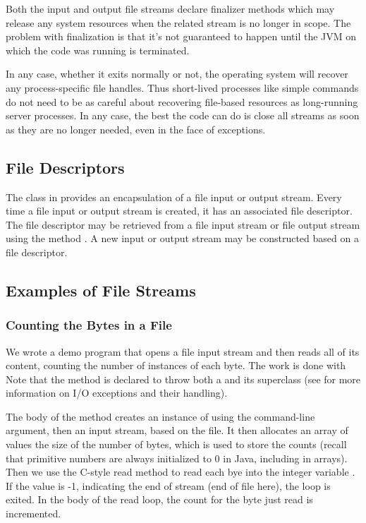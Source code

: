 Both the input and output file streams declare finalizer methods which
may release any system resources when the related stream is no longer
in scope.  The problem with finalization is that it's not guaranteed
to happen until the JVM on which the code was running is terminated.

In any case, whether it exits normally or not, the operating system
will recover any process-specific file handles.  Thus short-lived
processes like simple commands do not need to be as careful about
recovering file-based resources as long-running server processes.  In
any case, the best the code can do is close all streams as soon as
they are no longer needed, even in the face of exceptions.


\subsection{File Descriptors}\label{section:id-file-descriptors}

The  class in  provides an
encapsulation of a file input or output stream.  Every time a file
input or output stream is created, it has an associated file
descriptor.  The file descriptor may be retrieved from a file input
stream or file output stream using the method .  A new
input or output stream may be constructed based on a file descriptor.

\subsection{Examples of File Streams}


\subsubsection{Counting the Bytes in a File}\label{section:io-file-byte-count}

We wrote a demo program  that opens a file input
stream and then reads all of its content, counting the number of
instances of each byte.  The work is done with
%
%
Note that the  method is declared to throw both
a  and its superclass
 (see  for more information
on I/O exceptions and their handling).  

The body of the method creates an instance of  using the
command-line argument, then an input stream, based on the file.  It
then allocates an array of  values the size of the number
of bytes, which is used to store the counts (recall that primitive
numbers are always initialized to 0 in Java, including in arrays).
Then we use the C-style read method to read each bye into the integer
variable .  If the value is -1, indicating the end of stream
(end of file here), the loop is exited.  In the body of the read loop,
the count for the byte just read is incremented.

